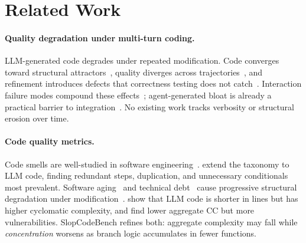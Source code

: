 \section{Related Work}
\label{sec:related_work}

\paragraph{Quality degradation under multi-turn coding.} LLM-generated code degrades under repeated modification. Code converges toward structural attractors~\citep{iterative-readability}, quality diverges across trajectories~\citep{chen2025-patch-quality, santos2025-software-aging}, and refinement introduces defects that correctness testing does not catch~\citep{scaffold-cegis, diff-fuzzing-refactoring, bohr2025-show-and-tell}. Interaction failure modes compound these effects~\citep{interaction-smells, overcorrection-reviewers, more-rounds-more-noise}; agent-generated bloat is already a practical barrier to integration~\citep{what-to-cut, nakashima2026-agentic-prs, vibe-coding-overhead}. No existing work tracks verbosity or structural erosion over time.

\paragraph{Code quality metrics.} Code smells are well-studied in software engineering~\citep{fowler1999-refactoring, lacerda2020-code-smells-tertiary}. \citet{abbassi2025-taxonomy-inefficiencies} extend the taxonomy to LLM code, finding redundant steps, duplication, and unnecessary conditionals most prevalent. Software aging~\citep{parnas1994-software-aging} and technical debt~\citep{cunningham1992-technical-debt} cause progressive structural degradation under modification~\citep{li2022-architecture-erosion, le2021-architectural-decay}. \citet{dou2024-whats-wrong-llm-code} show that LLM code is shorter in lines but has higher cyclomatic complexity, and \citet{cotroneo2025-human-vs-ai} find lower aggregate CC but more vulnerabilities. SlopCodeBench refines both: aggregate complexity may fall while \emph{concentration} worsens as branch logic accumulates in fewer functions.

